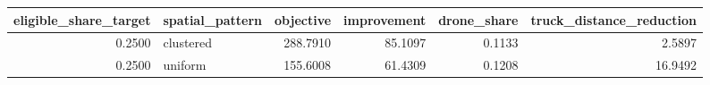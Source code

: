 \begin{tabular}{rlrrrr}
\toprule
eligible_share_target & spatial_pattern & objective & improvement & drone_share & truck_distance_reduction \\
\midrule
0.2500 & clustered & 288.7910 & 85.1097 & 0.1133 & 2.5897 \\
0.2500 & uniform & 155.6008 & 61.4309 & 0.1208 & 16.9492 \\
\bottomrule
\end{tabular}
